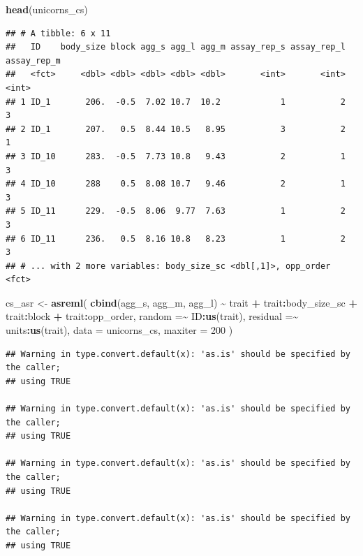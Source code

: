 \documentclass[
  12pt,
]{book}
\newenvironment{Shaded}{\begin{snugshade}}{\end{snugshade}}
\newcommand{\DataTypeTok}[1]{\textcolor[rgb]{0.13,0.29,0.53}{#1}}
\newcommand{\DecValTok}[1]{\textcolor[rgb]{0.00,0.00,0.81}{#1}}
\newcommand{\KeywordTok}[1]{\textcolor[rgb]{0.13,0.29,0.53}{\textbf{#1}}}
\newcommand{\NormalTok}[1]{#1}
\newcommand{\OperatorTok}[1]{\textcolor[rgb]{0.81,0.36,0.00}{\textbf{#1}}}
\newcommand{\StringTok}[1]{\textcolor[rgb]{0.31,0.60,0.02}{#1}}
\begin{document}
\begin{Shaded}
\begin{Highlighting}[]
\KeywordTok{head}\NormalTok{(unicorns\_cs)}
\end{Highlighting}
\end{Shaded}

\begin{verbatim}
## # A tibble: 6 x 11
##   ID    body_size block agg_s agg_l agg_m assay_rep_s assay_rep_l assay_rep_m
##   <fct>     <dbl> <dbl> <dbl> <dbl> <dbl>       <int>       <int>       <int>
## 1 ID_1       206.  -0.5  7.02 10.7  10.2            1           2           3
## 2 ID_1       207.   0.5  8.44 10.5   8.95           3           2           1
## 3 ID_10      283.  -0.5  7.73 10.8   9.43           2           1           3
## 4 ID_10      288    0.5  8.08 10.7   9.46           2           1           3
## 5 ID_11      229.  -0.5  8.06  9.77  7.63           1           2           3
## 6 ID_11      236.   0.5  8.16 10.8   8.23           1           2           3
## # ... with 2 more variables: body_size_sc <dbl[,1]>, opp_order <fct>
\end{verbatim}

\begin{Shaded}
\begin{Highlighting}[]
\NormalTok{cs\_asr \textless{}{-}}\StringTok{ }\KeywordTok{asreml}\NormalTok{(}
  \KeywordTok{cbind}\NormalTok{(agg\_s, agg\_m, agg\_l) }\OperatorTok{\textasciitilde{}}\StringTok{ }\NormalTok{trait }\OperatorTok{+}\StringTok{ }\NormalTok{trait}\OperatorTok{:}\NormalTok{body\_size\_sc }\OperatorTok{+}
\StringTok{    }\NormalTok{trait}\OperatorTok{:}\NormalTok{block }\OperatorTok{+}
\StringTok{    }\NormalTok{trait}\OperatorTok{:}\NormalTok{opp\_order,}
  \DataTypeTok{random =}\OperatorTok{\textasciitilde{}}\StringTok{ }\NormalTok{ID}\OperatorTok{:}\KeywordTok{us}\NormalTok{(trait),}
  \DataTypeTok{residual =}\OperatorTok{\textasciitilde{}}\StringTok{ }\NormalTok{units}\OperatorTok{:}\KeywordTok{us}\NormalTok{(trait),}
  \DataTypeTok{data =}\NormalTok{ unicorns\_cs,}
  \DataTypeTok{maxiter =} \DecValTok{200}
\NormalTok{)}
\end{Highlighting}
\end{Shaded}

\begin{verbatim}
## Warning in type.convert.default(x): 'as.is' should be specified by the caller;
## using TRUE

## Warning in type.convert.default(x): 'as.is' should be specified by the caller;
## using TRUE

## Warning in type.convert.default(x): 'as.is' should be specified by the caller;
## using TRUE

## Warning in type.convert.default(x): 'as.is' should be specified by the caller;
## using TRUE
\end{verbatim}
\end{document}
